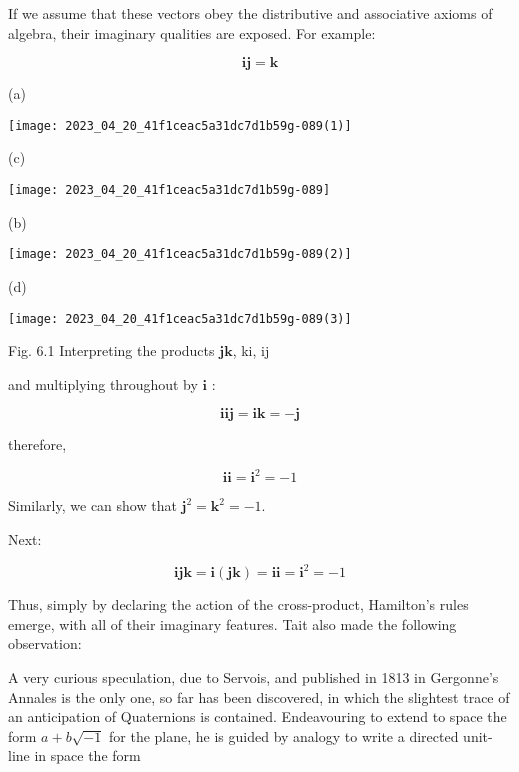 If we assume that these vectors obey the distributive and associative axioms of algebra, their imaginary qualities are exposed. For example:

$$
    \mathbf{i j}=\mathbf{k}
$$

(a)

\begin{center}
    \texttt{[image: 2023\_04\_20\_41f1ceac5a31dc7d1b59g-089(1)]}
\end{center}

(c)

\begin{center}
    \texttt{[image: 2023\_04\_20\_41f1ceac5a31dc7d1b59g-089]}
\end{center}

(b)

\begin{center}
    \texttt{[image: 2023\_04\_20\_41f1ceac5a31dc7d1b59g-089(2)]}
\end{center}

(d)

\begin{center}
    \texttt{[image: 2023\_04\_20\_41f1ceac5a31dc7d1b59g-089(3)]}
\end{center}

Fig. 6.1 Interpreting the products $\mathbf{j k}$, ki, ij

and multiplying throughout by $\mathbf{i}$ :

$$
    \mathbf{i i j}=\mathbf{i k}=-\mathbf{j}
$$

therefore,

$$
    \mathbf{i i}=\mathbf{i}^{2}=-1
$$

Similarly, we can show that $\mathbf{j}^{2}=\mathbf{k}^{2}=-1$.

Next:

$$
    \mathbf{i} \mathbf{j} \mathbf{k}=\mathbf{i}(\mathbf{j} \mathbf{k})=\mathbf{i} \mathbf{i}=\mathbf{i}^{2}=-1
$$

Thus, simply by declaring the action of the cross-product, Hamilton's rules emerge, with all of their imaginary features. Tait also made the following observation:

A very curious speculation, due to Servois, and published in 1813 in Gergonne's Annales is the only one, so far has been discovered, in which the slightest trace of an anticipation of Quaternions is contained. Endeavouring to extend to space the form $a+b \sqrt{-1}$ for the plane, he is guided by analogy to write a directed unit-line in space the form

